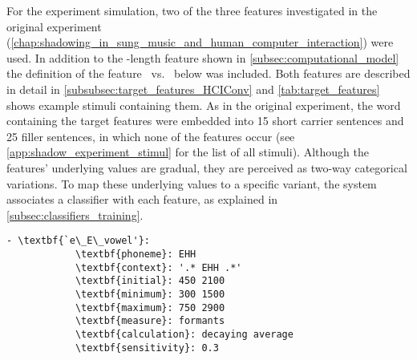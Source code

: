 For the experiment simulation, two of the three features investigated in the original experiment (\cref{chap:shadowing_in_sung_music_and_human_computer_interaction}) were used.
In addition to the -length feature shown in \cref{subsec:computational_model} the definition of the feature \textipa{[E:]}~vs.~\textipa{[e:]} below was included.
Both features are described in detail in \cref{subsubsec:target_features_HCIConv} and \cref{tab:target_features} shows example stimuli containing them.
As in the original experiment, the word containing the target features were embedded into 15 short carrier sentences and 25 filler sentences, in which none of the features occur (see \cref{app:shadow_experiment_stimul} for the list of all stimuli).
Although the features' underlying values are gradual, they are perceived as two-way categorical variations.
To map these underlying values to a specific variant, the system associates a classifier with each feature, as explained in \cref{subsec:classifiers_training}.
%
%
\begin{Verbatim}[tabsize=4, commandchars=\\\{\}]
	- \textbf{`e\_E\_vowel'}:
			\textbf{phoneme}: EHH
			\textbf{context}: '.* EHH .*'
			\textbf{initial}: 450 2100
			\textbf{minimum}: 300 1500
			\textbf{maximum}: 750 2900
			\textbf{measure}: formants
			\textbf{calculation}: decaying average
			\textbf{sensitivity}: 0.3
\end{Verbatim}
%
